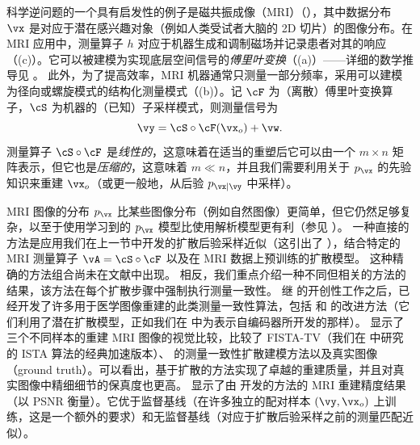 \documentclass[../../book-main_zh.tex]{subfiles}
\begin{document}
科学逆问题的一个具有启发性的例子是磁共振成像（MRI）（），其中数据分布 $\vx$ 是对应于潜在感兴趣对象（例如人类受试者大脑的 2D 切片）的图像分布。在 MRI 应用中，测量算子 $h$ 对应于机器生成和调制磁场并记录患者对其的响应（(c)）。它可以被建模为实现底层空间信号的\textit{傅里叶变换}（(a)）——详细的数学推导见 \cite[第10章]{Wright-Ma-2022}。
此外，为了提高效率，MRI 机器通常只测量一部分频率，采用可以建模为径向或螺旋模式的结构化测量模式（(b)）。记 $\cF$ 为（离散）傅里叶变换算子，$\cS$ 为机器的（已知）子采样模式，则测量信号为
\begin{equation}\label{eq:mri-measurement}
    \vy = \cS \circ \cF(\vx_o) + \vw.
\end{equation}
测量算子 $\cS \circ \cF$ 是\textit{线性的}，这意味着在适当的重塑后它可以由一个 $m \times n$ 矩阵表示，但它也是\textit{压缩的}，这意味着 $m \ll n$，并且我们需要利用关于 $p_{\vx}$ 的先验知识来重建 $\vx_o$（或更一般地，从后验 $p_{\vx \mid \vy}$ 中采样）。

MRI 图像的分布
$p_{\vx}$ 比某些图像分布（例如自然图像）更简单，但它仍然足够复杂，以至于使用学习到的 $p_{\vx}$ 模型比使用解析模型更有利（参见 \cite{Wright-Ma-2022}）。
一种直接的方法是应用我们在上一节中开发的扩散后验采样近似（这引出了
），结合特定的 MRI 测量算子 $\vA = \cS \circ \cF$ 以及在 MRI 数据上预训练的扩散模型。
这种精确的方法组合尚未在文献中出现。
相反，我们重点介绍一种不同但相关的方法的结果，该方法在每个扩散步骤中强制执行测量一致性。
继 \textcite{song2022solving} 的开创性工作之后，已经开发了许多用于医学图像重建的此类测量一致性算法，包括 \textcite{song2024solving} 和
\textcite{rout2023solving} 的改进方法（它们利用了潜在扩散模型，正如我们在
 中为表示自编码器所开发的那样）。
 显示了三个不同样本的重建 MRI 图像的视觉比较，比较了 FISTA-TV（我们在
 中研究的 ISTA 算法的经典加速版本）、\textcite{song2022solving} 的测量一致性扩散建模方法以及真实图像（ground truth）。可以看出，基于扩散的方法实现了卓越的重建质量，并且对真实图像中精细细节的保真度也更高。
 显示了由 \textcite{song2022solving} 开发的方法的 MRI 重建精度结果（以 PSNR 衡量）。它优于监督基线（在许多独立的配对样本 $(\vy,
\vx_o)$ 上训练，这是一个额外的要求）和无监督基线（对应于扩散后验采样之前的测量匹配近似）。
\end{document}
